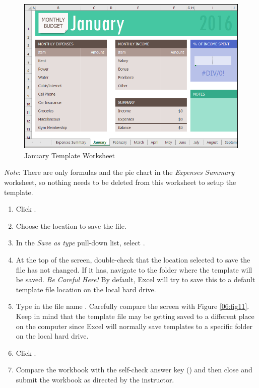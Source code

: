 \begin{figure}[H]
	\centering
	\includegraphics[width=\maxwidth{.95\linewidth}]{gfx/ch06_fig10}
	\caption{January Template Worksheet}
	\label{06:fig10}
\end{figure}

\textit{Note}: There are only formulas and the pie chart in the \textit{Expenses Summary} worksheet, so nothing needs to be deleted from this worksheet to setup the template.

\begin{enumerate}
	\item Click .
	\item Choose the location to save the file.
	\item In the \textit{Save as type} pull-down list, select .
	\item At the top of the screen, double-check that the location selected to save the file has not changed. If it has, navigate to the folder where the template will be saved. \textit{Be Careful Here!} By default, Excel will try to save this to a default template file location on the local hard drive.
	\item Type in the file name . Carefully compare the screen with Figure \ref{06:fig11}. Keep in mind that the template file may be getting saved to a different place on the computer since Excel will normally save templates to a specific folder on the local hard drive.
	\item Click .
	\item Compare the workbook with the self-check answer key () and then close and submit the  workbook as directed by the instructor.
	
\end{enumerate}

